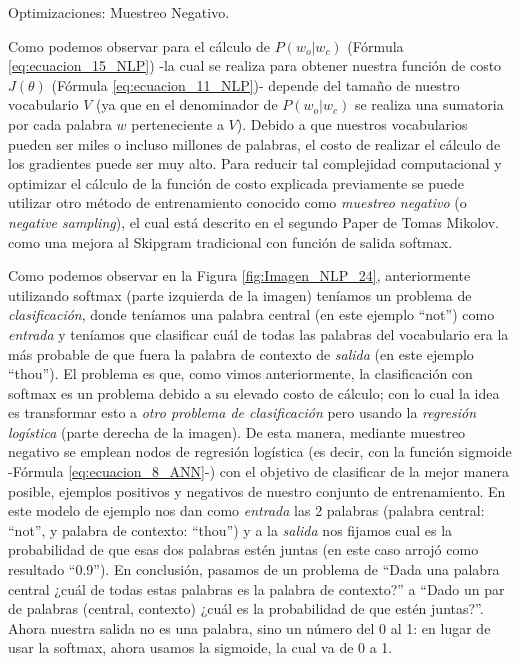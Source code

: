 \documentclass[12pt,a4paper]{article}
\makeatletter
\renewcommand\paragraph{\@startsection{paragraph}{4}{\z@}
            {-2.5ex\@plus -1ex \@minus -.25ex}
            {1.25ex \@plus .25ex}
            {\normalfont\normalsize\bfseries}}
\makeatother
\begin{document}
\begin{sloppypar}
\paragraph{Optimizaciones: Muestreo Negativo.}\label{neg_samp}

Como podemos observar para el cálculo de $P(w_o | w_c)$ (Fórmula \ref{eq:ecuacion_15_NLP}) -la cual se realiza para obtener nuestra función de costo $J(\theta)$  (Fórmula \ref{eq:ecuacion_11_NLP})- depende del tamaño de nuestro vocabulario $V$ (ya que en el denominador de $P(w_o | w_c)$ se realiza una sumatoria por cada palabra $w$ perteneciente a $V$). Debido a que nuestros vocabularios pueden ser miles o incluso millones de palabras, el costo de realizar el cálculo de los gradientes puede ser muy alto. Para reducir tal complejidad computacional y optimizar el cálculo de la función de costo explicada previamente se puede utilizar otro método de entrenamiento conocido como \textit{muestreo negativo} (o \textit{negative sampling}), el cual está descrito en el segundo Paper de Tomas Mikolov\cite{NLP_14}.  como una mejora al Skipgram tradicional con función de salida softmax.

Como podemos observar en la Figura \ref{fig:Imagen_NLP_24}, anteriormente utilizando softmax (parte izquierda de la imagen) teníamos un problema de \textit{clasificación}, donde teníamos una palabra central (en este ejemplo “not”) como \textit{entrada} y teníamos que clasificar cuál de todas las palabras del vocabulario era la más probable de que fuera la palabra de contexto de \textit{salida} (en este ejemplo “thou”).  El problema es que, como vimos anteriormente, la clasificación con softmax es un problema debido a su elevado costo de cálculo; con lo cual la idea es transformar esto a \textit{otro problema de clasificación} pero usando la \textit{regresión logística} (parte derecha de la imagen). De esta manera, mediante muestreo negativo se emplean nodos de regresión logística (es decir, con la función sigmoide -Fórmula \ref{eq:ecuacion_8_ANN}-) con el objetivo de clasificar de la mejor manera posible, ejemplos positivos y negativos de nuestro conjunto de entrenamiento\cite{NLP_13_2}. En este modelo de ejemplo nos dan como \textit{entrada} las 2 palabras (palabra central: “not”, y palabra de contexto: “thou”) y a la \textit{salida} nos fijamos cual es la probabilidad de que esas dos palabras estén juntas (en este caso arrojó como resultado “0.9”). En conclusión, pasamos de un problema de “Dada una palabra central ¿cuál de todas estas palabras es la palabra de contexto?” a “Dado un par de palabras (central, contexto) ¿cuál es la probabilidad de que estén juntas?”. Ahora nuestra salida no es una palabra, sino un número del 0 al 1: en lugar de usar la softmax, ahora usamos la sigmoide, la cual  va de 0 a 1. \\


\end{sloppypar}
\end{document}
